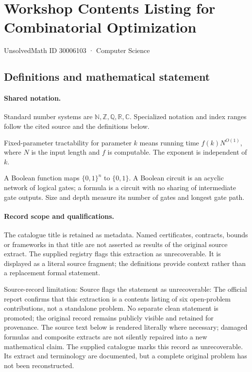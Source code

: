 \documentclass[11pt]{article}
\begin{document}
\setcounter{section}{30006102}
\section{Workshop Contents Listing for Combinatorial Optimization}\label{30006103}
{\small\sffamily UnsolvedMath ID 30006103 · Computer Science}
\subsection{Definitions and mathematical statement}

\paragraph{Shared notation.}Standard number systems are $\mathbb N,\mathbb Z,\mathbb Q,\mathbb R,\mathbb C$. Specialized notation and index ranges follow the cited source and the definitions below.


Fixed-parameter tractability for parameter $k$ means running time $f(k)N^{O(1)}$, where $N$ is the input length and $f$ is computable. The exponent is independent of $k$.

A Boolean function maps $\{0,1\}^n$ to $\{0,1\}$. A Boolean circuit is an acyclic network of logical gates; a formula is a circuit with no sharing of intermediate gate outputs. Size and depth measure its number of gates and longest gate path.
\paragraph{Record scope and qualifications.}
The catalogue title is retained as metadata. Named certificates, contracts, bounds or frameworks in that title are not asserted as results of the original source extract.
The supplied registry flags this extraction as unrecoverable. It is displayed as a literal source fragment; the definitions provide context rather than a replacement formal statement.

Source-record limitation: Source flags the statement as unrecoverable: The official report confirms that this extraction is a contents listing of six open-problem contributions, not a standalone problem. No separate clean statement is promoted; the original record remains publicly visible and retained for provenance.
The source text below is rendered literally where necessary; damaged formulas and composite extracts are not silently repaired into a new mathematical claim.
The supplied catalogue marks this record as unrecoverable. Its extract and terminology are documented, but a complete original problem has not been reconstructed.
\end{document}
